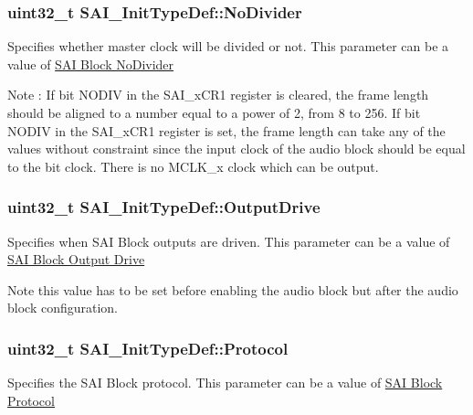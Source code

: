 \subsubsection[{\texorpdfstring{No\+Divider}{NoDivider}}]{\setlength{\rightskip}{0pt plus 5cm}uint32\+\_\+t S\+A\+I\+\_\+\+Init\+Type\+Def\+::\+No\+Divider}\hypertarget{struct_s_a_i___init_type_def_a1f2ec4f0a68f286459be1aa0c20beb55}{}\label{struct_s_a_i___init_type_def_a1f2ec4f0a68f286459be1aa0c20beb55}
Specifies whether master clock will be divided or not. This parameter can be a value of \hyperlink{group___s_a_i___block___no_divider}{S\+AI Block No\+Divider} \begin{DoxyNote}{Note}
\+: If bit N\+O\+D\+IV in the S\+A\+I\+\_\+x\+C\+R1 register is cleared, the frame length should be aligned to a number equal to a power of 2, from 8 to 256. If bit N\+O\+D\+IV in the S\+A\+I\+\_\+x\+C\+R1 register is set, the frame length can take any of the values without constraint since the input clock of the audio block should be equal to the bit clock. There is no M\+C\+L\+K\+\_\+x clock which can be output. 
\end{DoxyNote}
\subsubsection[{\texorpdfstring{Output\+Drive}{OutputDrive}}]{\setlength{\rightskip}{0pt plus 5cm}uint32\+\_\+t S\+A\+I\+\_\+\+Init\+Type\+Def\+::\+Output\+Drive}\hypertarget{struct_s_a_i___init_type_def_a9f8ad868ab366713e8d812b2673dd5f8}{}\label{struct_s_a_i___init_type_def_a9f8ad868ab366713e8d812b2673dd5f8}
Specifies when S\+AI Block outputs are driven. This parameter can be a value of \hyperlink{group___s_a_i___block___output___drive}{S\+AI Block Output Drive} \begin{DoxyNote}{Note}
this value has to be set before enabling the audio block but after the audio block configuration. 
\end{DoxyNote}
\subsubsection[{\texorpdfstring{Protocol}{Protocol}}]{\setlength{\rightskip}{0pt plus 5cm}uint32\+\_\+t S\+A\+I\+\_\+\+Init\+Type\+Def\+::\+Protocol}\hypertarget{struct_s_a_i___init_type_def_a0cafd999f80015e472bff2812642746c}{}\label{struct_s_a_i___init_type_def_a0cafd999f80015e472bff2812642746c}
Specifies the S\+AI Block protocol. This parameter can be a value of \hyperlink{group___s_a_i___block___protocol}{S\+AI Block Protocol} 
